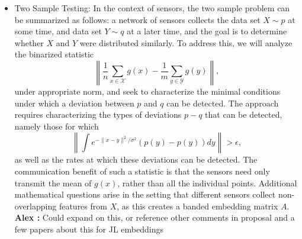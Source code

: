 \documentclass{article}
\newcommand{\comment}[3]{{\color{#1} {\bf #2 :} #3}}
\newcommand{\yoav}[1]{\comment{magenta}{Yoav}{#1}}
\newcommand{\rayan}[1]{\comment{red}{Rayan}{#1}}
\newcommand{\alex}[1]{\comment{green}{Alex}{#1}}
\begin{document}
\begin{itemize}
\item Two Sample Testing: 
In the context of sensors, the two sample problem can be summarized as follows: a network of sensors collects the data set $X\sim p$ at some time, and data set $Y\sim q$ at a later time, and the goal is to determine whether $X$ and $Y$ were distributed similarly.  To address this, we will analyze the binarized statistic $$\left\|\frac{1}{n}\sum_{x\in \mathcal{X}} g(x) - \frac{1}{m}\sum_{y\in \mathcal{Y}} g(y)\right\|,$$
under appropriate norm, and seek to characterize the minimal conditions under which a deviation between $p$ and $q$ can be detected.   The approach requires characterizing the types of deviations $p - q$ that can be detected, namely those for which $$\left\|\int e^{-\|x-y\|^2/\sigma^2} (p(y) - p(y)) dy \right\| > \epsilon,$$ as well as the rates at which these deviations can be detected.
The communication benefit of such a statistic is that the sensors need only transmit the mean of $g(x)$, rather than all the individual points.  Additional mathematical questions arise in the setting that different sensors collect non-overlapping features from $X$, as this creates a banded embedding matrix $A$. \alex{Could expand on this, or reference other comments in proposal and a few papers about this for JL embeddings}

\end{itemize}
\end{document}
